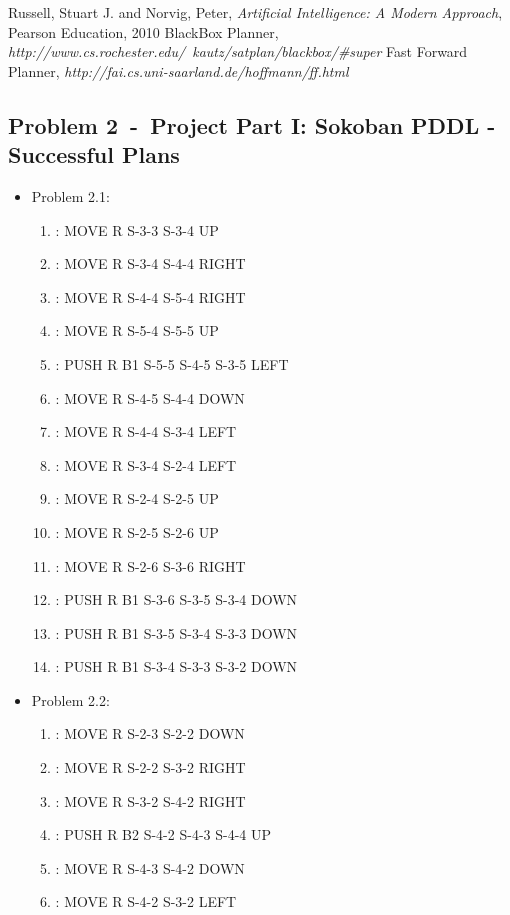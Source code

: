 \documentclass[12pt]{article}
\newcommand{\problem}[2]{\section*{Problem {#1}~-~{#2}}}
\begin{document}
\begin{thebibliography}{50}
   Russell, Stuart J. and Norvig, Peter, \textsl{Artificial Intelligence: A Modern Approach}, Pearson Education, 2010
   BlackBox Planner, \textsl{http://www.cs.rochester.edu/~kautz/satplan/blackbox/\#super}
   Fast Forward Planner, \textsl{http://fai.cs.uni-saarland.de/hoffmann/ff.html}
\end{thebibliography}

\newpage
\begin{appendix}
\problem{2}{Project Part I: Sokoban PDDL - Successful Plans}
  \begin{itemize}
    \item Problem 2.1:
      \begin{enumerate}
	\item: MOVE R S-3-3 S-3-4 UP
	\item: MOVE R S-3-4 S-4-4 RIGHT
	\item: MOVE R S-4-4 S-5-4 RIGHT
	\item: MOVE R S-5-4 S-5-5 UP
	\item: PUSH R B1 S-5-5 S-4-5 S-3-5 LEFT
	\item: MOVE R S-4-5 S-4-4 DOWN
	\item: MOVE R S-4-4 S-3-4 LEFT
	\item: MOVE R S-3-4 S-2-4 LEFT
	\item: MOVE R S-2-4 S-2-5 UP
	\item: MOVE R S-2-5 S-2-6 UP
	\item : MOVE R S-2-6 S-3-6 RIGHT
	\item: PUSH R B1 S-3-6 S-3-5 S-3-4 DOWN
	\item: PUSH R B1 S-3-5 S-3-4 S-3-3 DOWN
	\item: PUSH R B1 S-3-4 S-3-3 S-3-2 DOWN
      \end{enumerate}
    \item Problem 2.2:
      \begin{enumerate}
	\item: MOVE R S-2-3 S-2-2 DOWN
	\item: MOVE R S-2-2 S-3-2 RIGHT
	\item: MOVE R S-3-2 S-4-2 RIGHT
	\item: PUSH R B2 S-4-2 S-4-3 S-4-4 UP
	\item: MOVE R S-4-3 S-4-2 DOWN
	\item: MOVE R S-4-2 S-3-2 LEFT

\end{enumerate}
\end{itemize}
\end{appendix}
\end{document}
